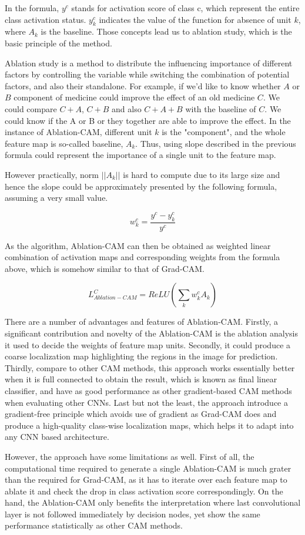 \documentclass[conference]{IEEEtran}
\begin{document}
In the formula, $y^c$ stands for activation score of class c, which represent the entire class activation status. $y^c_k$ indicates the value of the function for absence of unit $k$, where $A_k$ is the baseline. Those concepts lead us to ablation study, which is the basic principle of the method.\par
Ablation study is a method to distribute the influencing importance of different factors by controlling the variable while switching the combination of potential factors, and also their standalone. For example, if we'd like to know whether $A$ or $B$ component of medicine could improve the effect of an old medicine $C$. We could compare $C+A$, $C+B$ and also $C+A+B$ with the baseline of $C$. We could know if the A or B or they together are able to improve the effect. In the instance of Ablation-CAM, different unit $k$ is the "component", and the whole feature map is so-called baseline, $A_k$. Thus, using slope described in the previous formula could represent the importance of a single unit to the feature map.\par
However practically, norm $||A_k||$ is hard to compute due to its large size and hence the slope could be approximately presented by the following formula, assuming a very small value.

$$w^c_k = \frac{y^c-y^c_k}{y^c}$$

As the algorithm, Ablation-CAM can then be obtained as weighted linear combination of activation maps and corresponding weights from the formula above, which is somehow similar to that of Grad-CAM.

$$L^C_{Ablation-CAM}=ReLU(\sum_k {w^c_k}{A_k})$$

There are a number of advantages and features of Ablation-CAM. Firstly, a significant contribution and novelty of the Ablation-CAM is the ablation analysis it used to decide the weights of feature map units. Secondly, it could produce a coarse localization map highlighting the regions in the image for prediction. Thirdly, compare to other CAM methods, this approach works essentially better when it is full connected to obtain the result, which is known as final linear classifier, and have as good performance as other gradient-based CAM methods when evaluating other CNNs. Last but not the least, the approach introduce a gradient-free principle which avoids use of gradient as Grad-CAM does and produce a high-quality class-wise localization maps, which helps it to adapt into any CNN based architecture.\par
However, the approach have some limitations as well. First of all, the computational time required to generate a single Ablation-CAM is much grater than the required for Grad-CAM, as it has to iterate over each feature map to ablate it and check the drop in class activation score correspondingly. On the hand, the Ablation-CAM only benefits the interpretation where last convolutional layer is not followed immediately by decision nodes, yet show the same performance statistically as other CAM methods.\par
\end{document}
